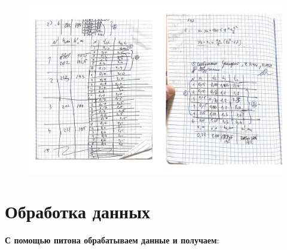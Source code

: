 \documentclass[a4paper]{article}
\begin{document}
\begin{figure}[H]
\begin{center}
\includegraphics[scale=0.5]{1_2.png}\\
\end{center}
\end{figure}

\section{Обработка данных}
\textbf{С помощью питона обрабатываем данные и получаем}:
\end{document}
